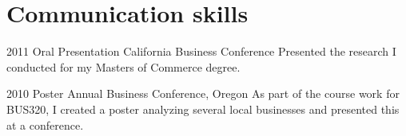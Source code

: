 \documentclass[a4paper,nocolors]{cv-friggeri-x}
\begin{document}

\section{Communication skills}

\begin{entrylist}


\entry
{2011}
{Oral Presentation}
{California Business Conference}
{Presented the research I conducted for my Masters of Commerce degree.}


\entry
{2010}
{Poster}
{Annual Business Conference, Oregon}
{As part of the course work for BUS320, I created a poster analyzing several local businesses and presented this at a conference.}


\end{entrylist}
\end{document}

